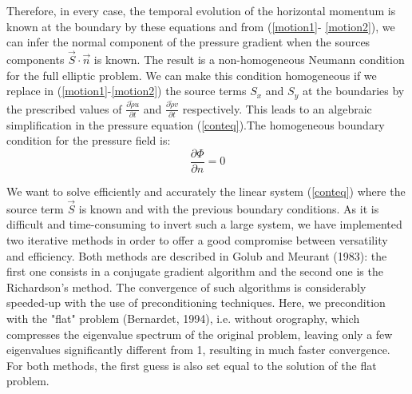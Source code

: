 Therefore, in every case, the temporal evolution of the horizontal momentum is
known at the boundary by these equations and from (\ref{motion1}-
\ref{motion2}), we can infer the normal component of the pressure gradient
when the sources components $\vec{S} \cdot \vec{n}$ is known.
The result is a non-homogeneous Neumann condition for the full elliptic
problem. We can make this condition homogeneous if we replace in
(\ref{motion1}-\ref{motion2}) the source terms $S_x$ and $S_y$ at the
boundaries by the prescribed values of $\frac {\partial{\tilde{\rho} { u }}
} {\partial{t} }$ and $\frac {\partial{\tilde{\rho} { v }} }
{\partial{t} }$ respectively. This leads to an algebraic simplification
in the pressure equation (\ref{conteq}).The homogeneous boundary condition
for the pressure field is:
\begin{equation}
\label{hb1}
\dfrac{\partial{\Phi } } {\partial{n} } = 0
\end{equation}
\par We want to solve efficiently and accurately the linear system
(\ref{conteq}) where the source term $\overrightarrow {S}$ is known and with
the previous boundary conditions. As it is
difficult and time-consuming to invert such a large system, we have
implemented two iterative methods in order to offer a good compromise between
versatility and efficiency. Both methods are described
in Golub and Meurant (1983\nocite{gol83}): the first one consists in
a conjugate gradient algorithm and the second one is the Richardson's method.
The convergence of such algorithms is considerably speeded-up with the use
of preconditioning techniques. Here, we precondition with the "flat"
problem (Bernardet\nocite{ber94}, 1994), i.e. without orography, which
compresses the eigenvalue spectrum of the original problem, leaving only a few
eigenvalues significantly different from 1, resulting in much faster
convergence. For both methods, the first guess is also set equal to the
solution of the flat problem.
